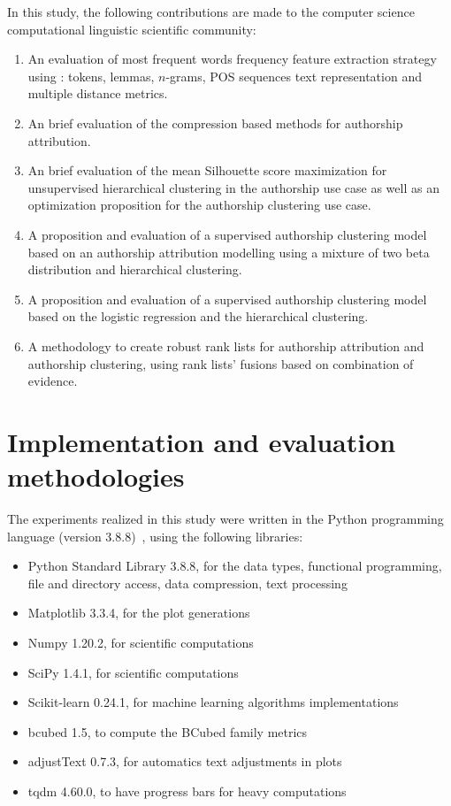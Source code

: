 In this study, the following contributions are made to the computer science computational linguistic scientific community:

\begin{enumerate}
  \item
  An evaluation of most frequent words frequency feature extraction strategy using : tokens, lemmas, $n$-grams, POS sequences text representation and multiple distance metrics.
  \item
  An brief evaluation of the compression based methods for authorship attribution.
  \item
  An brief evaluation of the mean Silhouette score maximization for unsupervised hierarchical clustering in the authorship use case as well as an optimization proposition for the authorship clustering use case.
  \item
  A proposition and evaluation of a supervised authorship clustering model based on an authorship attribution modelling using a mixture of two beta distribution and hierarchical clustering.
  \item
  A proposition and evaluation of a supervised authorship clustering model based on the logistic regression and the hierarchical clustering.
  \item
  A methodology to create robust rank lists for authorship attribution and authorship clustering, using rank lists' fusions based on combination of evidence.
\end{enumerate}

\section{Implementation and evaluation methodologies}

The experiments realized in this study were written in the Python programming language (version 3.8.8)~\cite{python}, using the following libraries:

\begin{itemize}
  \item Python Standard Library 3.8.8, for the data types, functional programming, file and directory access, data compression, text processing~\cite{python_standard_library}
  \item Matplotlib 3.3.4, for the plot generations~\cite{matplotlib}
  \item Numpy 1.20.2, for scientific computations~\cite{numpy}
  \item SciPy 1.4.1, for scientific computations~\cite{scipy}
  \item Scikit-learn 0.24.1, for machine learning algorithms implementations~\cite{sklearn}
  \item bcubed 1.5, to compute the BCubed family metrics~\cite{bcubed_gh}
  \item adjustText 0.7.3, for automatics text adjustments in plots~\cite{adjustText}
  \item tqdm 4.60.0, to have progress bars for heavy computations~\cite{tqdm}
\end{itemize}

